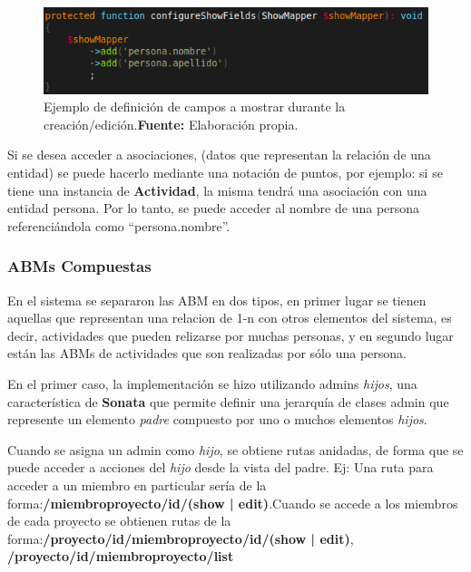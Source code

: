 \begin{figure}[h]
    \includegraphics[width=1\linewidth]{image/show.png}
    \caption{Ejemplo de definición de campos a mostrar durante la creación/edición.\newline \textbf{Fuente:} Elaboración propia.}
    \label{fig:image/show}
\end{figure}

Si se desea acceder a asociaciones, (datos que representan la relación de una entidad) se puede hacerlo mediante una notación de puntos, por ejemplo:
si se tiene una instancia de \textbf{Actividad}, la misma tendrá una asociación con una entidad persona\@. Por lo tanto, se puede acceder al nombre de una
persona referenciándola como ``persona.nombre''.

\subsubsection{ABMs Compuestas}%
\label{ssub:admin_proyectadmin_proyecto}

En el sistema se separaron las ABM en dos tipos, en primer lugar se tienen aquellas que representan una relacion de 1-n con otros elementos del sistema, es decir, actividades que pueden
relizarse por muchas personas, y en segundo lugar están las ABMs de actividades que son realizadas por sólo una persona.


En el primer caso, la implementación se hizo utilizando admins \textit{hijos}, una característica de \textbf{Sonata} que permite definir una jerarquía de clases admin que represente un
elemento \textit{padre} compuesto por uno o muchos elementos \textit{hijos}.

Cuando se asigna un admin como \textit{hijo}, se obtiene rutas anidadas, de forma que se puede acceder a acciones del \textit{hijo} desde la vista del padre. Ej: Una ruta
para acceder a un miembro en particular sería de la forma:\newline \textbf{/miembroproyecto/{id}/(show | edit)}\@.\newline\newline Cuando se accede a los
miembros de cada proyecto se obtienen rutas de la forma:\newline \textbf{/proyecto/{id}/miembroproyecto/{id}/(show | edit)},
\newline \textbf{/proyecto/{id}/miembroproyecto/list}\newline

